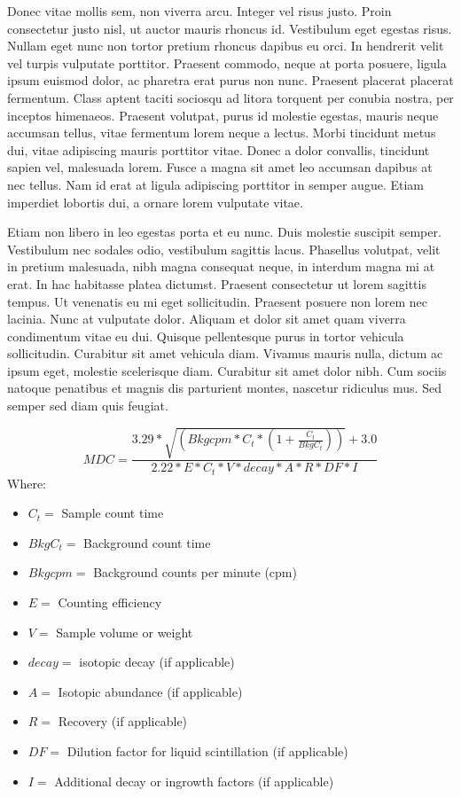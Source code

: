 \documentclass[double,12pt]{beavtex}
\begin{document}
Donec vitae mollis sem, non viverra arcu. Integer vel risus justo. Proin consectetur justo nisl, ut auctor mauris rhoncus id. Vestibulum eget egestas risus. Nullam eget nunc non tortor pretium rhoncus dapibus eu orci. In hendrerit velit vel turpis vulputate porttitor. Praesent commodo, neque at porta posuere, ligula ipsum euismod dolor, ac pharetra erat purus non nunc. Praesent placerat placerat fermentum. Class aptent taciti sociosqu ad litora torquent per conubia nostra, per inceptos himenaeos. Praesent volutpat, purus id molestie egestas, mauris neque accumsan tellus, vitae fermentum lorem neque a lectus. Morbi tincidunt metus dui, vitae adipiscing mauris porttitor vitae. Donec a dolor convallis, tincidunt sapien vel, malesuada lorem. Fusce a magna sit amet leo accumsan dapibus at nec tellus. Nam id erat at ligula adipiscing porttitor in semper augue. Etiam imperdiet lobortis dui, a ornare lorem vulputate vitae. 

Etiam non libero in leo egestas porta et eu nunc. Duis molestie suscipit semper. Vestibulum nec sodales odio, vestibulum sagittis lacus. Phasellus volutpat, velit in pretium malesuada, nibh magna consequat neque, in interdum magna mi at erat. In hac habitasse platea dictumst. Praesent consectetur ut lorem sagittis tempus. Ut venenatis eu mi eget sollicitudin. Praesent posuere non lorem nec lacinia. Nunc at vulputate dolor. Aliquam et dolor sit amet quam viverra condimentum vitae eu dui. Quisque pellentesque purus in tortor vehicula sollicitudin. Curabitur sit amet vehicula diam. Vivamus mauris nulla, dictum ac ipsum eget, molestie scelerisque diam. Curabitur sit amet dolor nibh. Cum sociis natoque penatibus et magnis dis parturient montes, nascetur ridiculus mus. Sed semper sed diam quis feugiat. 


\begin{equation}
MDC=\frac{3.29*\sqrt{(Bkgcpm*C_{t}*(1+\frac{C_{t}}{BkgC_{t}}))}+3.0}{2.22*E*C_{t}*V*decay*A*R*DF*I}
\label{eq:mdc}
\end{equation}
Where:

\begin{itemize}
\item $C_{t} =$ Sample count time
\item $BkgC_{t} =$ Background count time
\item $Bkgcpm =$ Background counts per minute (cpm)
\item $E =$ Counting efficiency
\item $V =$ Sample volume or weight
\item $decay =$ isotopic decay (if applicable)
\item $A =$ Isotopic abundance (if applicable)
\item $R =$ Recovery (if applicable)
\item $DF =$ Dilution factor for liquid scintillation (if applicable)
\item $I =$ Additional decay or ingrowth factors (if applicable)
\end{itemize}
\end{document}
